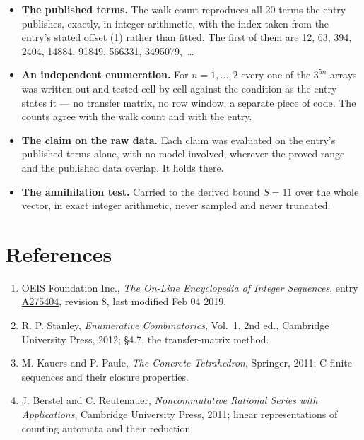 \documentclass[11pt]{article}
\theoremstyle{definition}
\begin{document}
\begin{itemize}

\item {\bfseries The published terms.} The walk count reproduces all 20 terms the entry publishes, exactly, in integer arithmetic, with the index taken from the entry's stated offset (1) rather than fitted. The first of them are 12, 63, 394, 2404, 14884, 91849, 566331, 3495079,~\dots

\item {\bfseries An independent enumeration.} For $n = 1,\dots,2$ every one of the $3^{5n}$ arrays was written out and tested cell by cell against the condition as the entry states it --- no transfer matrix, no row window, a separate piece of code. The counts agree with the walk count and with the entry.

\item {\bfseries The claim on the raw data.} Each claim was evaluated on the entry's published terms alone, with no model involved, wherever the proved range and the published data overlap. It holds there.

\item {\bfseries The annihilation test.} Carried to the derived bound $S = 11$ over the whole vector, in exact integer arithmetic, never sampled and never truncated.

\end{itemize}

\section{References}

\begin{enumerate}

\item OEIS Foundation Inc., \emph{The On-Line Encyclopedia of Integer Sequences}, entry \href{https://oeis.org/A275404}{A275404}, revision 8, last modified Feb 04 2019.

\item R. P. Stanley, \emph{Enumerative Combinatorics}, Vol.~1, 2nd ed., Cambridge University Press, 2012; \S4.7, the transfer-matrix method.

\item M. Kauers and P. Paule, \emph{The Concrete Tetrahedron}, Springer, 2011; C-finite sequences and their closure properties.

\item J. Berstel and C. Reutenauer, \emph{Noncommutative Rational Series with Applications}, Cambridge University Press, 2011; linear representations of counting automata and their reduction.

\end{enumerate}
\end{document}
